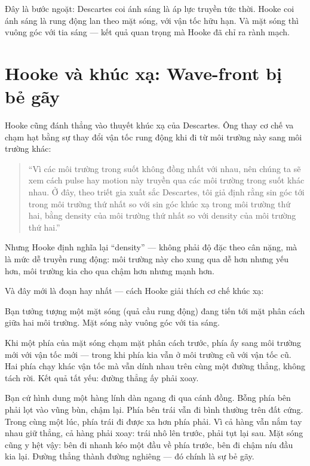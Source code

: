 Đây là bước ngoặt: Descartes coi ánh sáng là áp lực truyền tức thời. Hooke coi ánh sáng là rung động lan theo mặt sóng, với vận tốc hữu hạn. Và mặt sóng thì vuông góc với tia sáng — kết quả quan trọng mà Hooke đã chỉ ra rành mạch.


\section{Hooke và khúc xạ: Wave-front bị bẻ gãy}

Hooke cũng đánh thẳng vào thuyết khúc xạ của Descartes. Ông thay cơ chế va chạm hạt bằng sự thay đổi vận tốc rung động khi đi từ môi trường này sang môi trường khác:

\begin{quote}
“Vì các môi trường trong suốt không đồng nhất với nhau, nên chúng ta sẽ xem cách pulse hay motion này truyền qua các môi trường trong suốt khác nhau. Ở đây, theo triết gia xuất sắc Descartes, tôi giả định rằng sin góc tới trong môi trường thứ nhất so với sin góc khúc xạ trong môi trường thứ hai, bằng density của môi trường thứ nhất so với density của môi trường thứ hai.”
\end{quote}

Nhưng Hooke định nghĩa lại “density” — không phải độ đặc theo cân nặng, mà là mức dễ truyền rung động: môi trường này cho xung qua dễ hơn nhưng yếu hơn, môi trường kia cho qua chậm hơn nhưng mạnh hơn.

Và đây mới là đoạn hay nhất — cách Hooke giải thích cơ chế khúc xạ:

Bạn tưởng tượng một mặt sóng (quả cầu rung động) đang tiến tới mặt phân cách giữa hai môi trường. Mặt sóng này vuông góc với tia sáng.

Khi một phía của mặt sóng chạm mặt phân cách trước, phía ấy sang môi trường mới với vận tốc mới — trong khi phía kia vẫn ở môi trường cũ với vận tốc cũ. Hai phía chạy khác vận tốc mà vẫn dính nhau trên cùng một đường thẳng, không tách rời. Kết quả tất yếu: đường thẳng ấy phải xoay.

Bạn cứ hình dung một hàng lính dàn ngang đi qua cánh đồng. Bỗng phía bên phải lọt vào vũng bùn, chậm lại. Phía bên trái vẫn đi bình thường trên đất cứng. Trong cùng một lúc, phía trái đi được xa hơn phía phải. Vì cả hàng vẫn nắm tay nhau giữ thẳng, cả hàng phải xoay: trái nhô lên trước, phải tụt lại sau. Mặt sóng cũng y hệt vậy: bên đi nhanh kéo một đầu về phía trước, bên đi chậm níu đầu kia lại. Đường thẳng thành đường nghiêng — đó chính là sự bẻ gãy.

